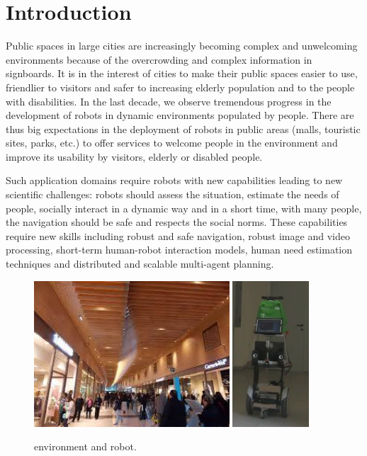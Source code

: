 \section{Introduction}
\label{sec:intro}

Public spaces in large cities are increasingly becoming complex and unwelcoming environments because of the overcrowding and complex information in signboards. It is in the interest of cities to make their public spaces easier to use, friendlier to visitors and safer to increasing elderly population and to the people with disabilities.
%
In the last decade, we observe tremendous progress in the development of robots in dynamic environments populated by people. There are thus big expectations in the deployment of robots in public areas (malls, touristic sites, parks, etc.) to offer services to welcome people in the environment and improve its usability by visitors, elderly or disabled people. 

Such application domains require robots with new capabilities leading to new scientific challenges: robots should assess the situation, estimate the needs of people, socially interact in a dynamic way and in a short time, with many people, the navigation should be safe and respects the social norms. These capabilities require new skills including robust and safe navigation, robust image and video processing, short-term human-robot interaction models, human need estimation techniques and distributed and scalable multi-agent planning.

\begin{figure}[t!]
\centering
\includegraphics[width=0.65\textwidth]{fig/rivedelorne}
\hspace{0.8cm}
\includegraphics[width=0.255\textwidth]{fig/diago1}
\caption{\coaches environment and robot.}
\label{fig:env}
\end{figure}

